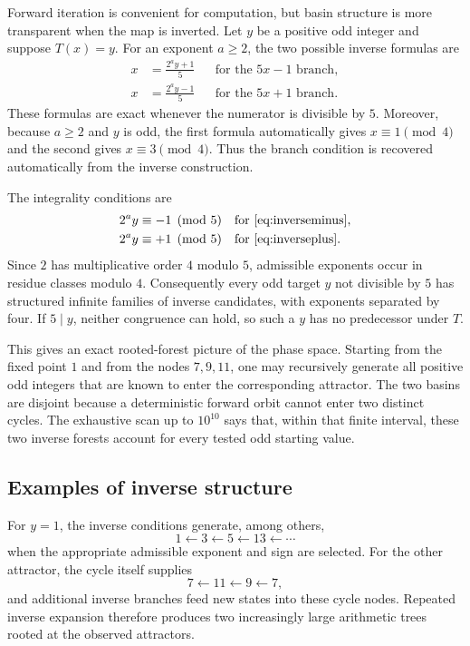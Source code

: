 \documentclass[11pt]{article}
\begin{document}
Forward iteration is convenient for computation, but basin structure is more transparent when the map is inverted.  Let $y$ be a positive odd integer and suppose $T(x)=y$.  For an exponent $a\ge2$, the two possible inverse formulas are
\begin{align}
x&=\frac{2^a y+1}{5} &&\text{for the }5x-1\text{ branch},
\label{eq:inverseminus}\\
x&=\frac{2^a y-1}{5} &&\text{for the }5x+1\text{ branch}.
\label{eq:inverseplus}
\end{align}
These formulas are exact whenever the numerator is divisible by $5$.  Moreover, because $a\ge2$ and $y$ is odd, the first formula automatically gives $x\equiv1\pmod4$ and the second gives $x\equiv3\pmod4$.  Thus the branch condition is recovered automatically from the inverse construction.

The integrality conditions are
\begin{align}
2^a y&\equiv-1\pmod5 &&\text{for \eqref{eq:inverseminus}},\label{eq:invcongminus}\\
2^a y&\equiv+1\pmod5 &&\text{for \eqref{eq:inverseplus}}.\label{eq:invcongplus}
\end{align}
Since $2$ has multiplicative order $4$ modulo $5$, admissible exponents occur in residue classes modulo $4$.  Consequently every odd target $y$ not divisible by $5$ has structured infinite families of inverse candidates, with exponents separated by four.  If $5\mid y$, neither congruence can hold, so such a $y$ has no predecessor under $T$.

This gives an exact rooted-forest picture of the phase space.  Starting from the fixed point $1$ and from the nodes $7,9,11$, one may recursively generate all positive odd integers that are known to enter the corresponding attractor.  The two basins are disjoint because a deterministic forward orbit cannot enter two distinct cycles.  The exhaustive scan up to $10^{10}$ says that, within that finite interval, these two inverse forests account for every tested odd starting value.

\subsection{Examples of inverse structure}

For $y=1$, the inverse conditions generate, among others,
\[
1\leftarrow3\leftarrow5\leftarrow13\leftarrow\cdots
\]
when the appropriate admissible exponent and sign are selected.  For the other attractor, the cycle itself supplies
\[
7\leftarrow11\leftarrow9\leftarrow7,
\]
and additional inverse branches feed new states into these cycle nodes.  Repeated inverse expansion therefore produces two increasingly large arithmetic trees rooted at the observed attractors.
\end{document}
